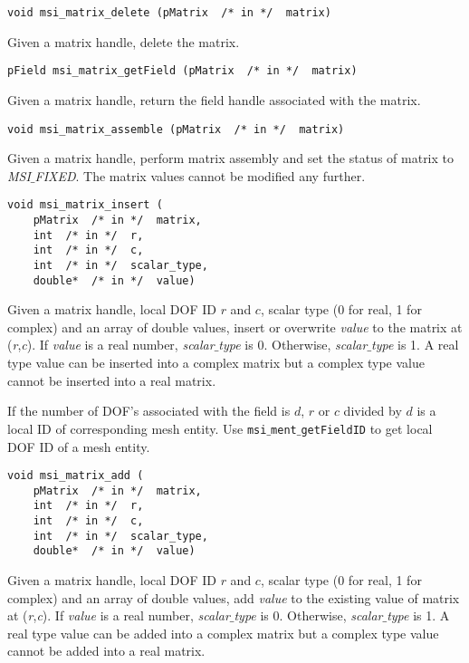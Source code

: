 \begin{verbatim}
void msi_matrix_delete (pMatrix  /* in */  matrix)
\end{verbatim}\vspace{-.5cm}\hspace{1cm}
Given a matrix handle, delete the matrix. 
	    
\begin{verbatim}
pField msi_matrix_getField (pMatrix  /* in */  matrix)
\end{verbatim}\vspace{-.5cm}\hspace{1cm}
Given a matrix handle, return the field handle associated with the matrix. 

\begin{verbatim}
void msi_matrix_assemble (pMatrix  /* in */  matrix)
\end{verbatim}\vspace{-.5cm}\hspace{1cm}
Given a matrix handle, perform matrix assembly and set the status of matrix  to \textit{MSI$\_$FIXED}. 
The matrix values cannot be modified any further.

\begin{verbatim}
void msi_matrix_insert (
    pMatrix  /* in */  matrix, 
    int  /* in */  r, 
    int  /* in */  c, 
    int  /* in */  scalar_type,
    double*  /* in */  value)
\end{verbatim}\vspace{-.5cm}\hspace{1cm}
Given a matrix handle, local DOF ID $r$ and $c$, scalar type (0 for real, 1 for complex) and an array of double values, insert or overwrite \textit{value} to the matrix at (\textit{r},\textit{c}). If \textit{value} is a real number, \textit{scalar$\_$type} is 0. Otherwise, \textit{scalar$\_$type} is 1. A real type value can be inserted into a complex matrix but a complex type value cannot be inserted into a real matrix.   

If the number of DOF's associated with the field is $d$, $r$ or $c$ divided by $d$ is a local ID of corresponding mesh entity. Use \texttt{msi$\_$ment$\_$getFieldID} to get local DOF ID of a mesh entity.

\begin{verbatim}
void msi_matrix_add (
    pMatrix  /* in */  matrix, 
    int  /* in */  r, 
    int  /* in */  c, 
    int  /* in */  scalar_type,
    double*  /* in */  value)
\end{verbatim}\vspace{-.5cm}\hspace{1cm}
Given a matrix handle, local DOF ID $r$ and $c$, scalar type (0 for real, 1 for complex) and an array of double values, add \textit{value} to the existing value of matrix at (\textit{r},\textit{c}). If \textit{value} is a real number, \textit{scalar$\_$type} is 0. Otherwise, \textit{scalar$\_$type} is 1. A real type value can be added into a complex matrix but a complex type value cannot be added into a real matrix.   

